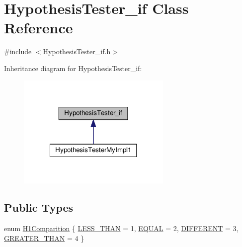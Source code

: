 \hypertarget{class_hypothesis_tester__if}{\section{Hypothesis\-Tester\-\_\-if Class Reference}
\label{class_hypothesis_tester__if}
}


{\ttfamily \#include $<$Hypothesis\-Tester\-\_\-if.\-h$>$}



Inheritance diagram for Hypothesis\-Tester\-\_\-if\-:
\nopagebreak
\begin{figure}[H]
\begin{center}
\leavevmode
\includegraphics[width=210pt]{class_hypothesis_tester__if__inherit__graph}
\end{center}
\end{figure}
\subsection*{Public Types}
\begin{DoxyCompactItemize}
\item 
enum \hyperlink{class_hypothesis_tester__if_a89153ff990252f9f79856a2f2532c349}{H1\-Comparition} \{ \hyperlink{class_hypothesis_tester__if_a89153ff990252f9f79856a2f2532c349a58aba9f031dcbe91654e790416d84969}{L\-E\-S\-S\-\_\-\-T\-H\-A\-N} = 1, 
\hyperlink{class_hypothesis_tester__if_a89153ff990252f9f79856a2f2532c349a42d8b143727dc6856dddb0d0ce94c791}{E\-Q\-U\-A\-L} = 2, 
\hyperlink{class_hypothesis_tester__if_a89153ff990252f9f79856a2f2532c349acf8c0147414ce2a7cfdc8b26854464f8}{D\-I\-F\-F\-E\-R\-E\-N\-T} = 3, 
\hyperlink{class_hypothesis_tester__if_a89153ff990252f9f79856a2f2532c349ad0539d107f27b07e600a3c46da5b1934}{G\-R\-E\-A\-T\-E\-R\-\_\-\-T\-H\-A\-N} = 4
 \}
\end{DoxyCompactItemize}
